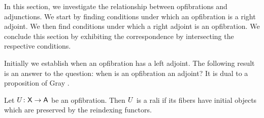 \documentclass{amsart}
\begin{document}
In this section, we investigate the relationship between opfibrations and adjunctions. We start by finding conditions under which an opfibration is a right adjoint.  We then find conditions under which a right adjoint is an opfibration. We conclude this section by exhibiting the correspondence by intersecting the respective conditions.

Initially we establish when an opfibration has a left adjoint. The following result is an answer to the question: when is an opfibration an adjoint? It is dual to a proposition of Gray \cite[Prop. 4.4]{Grayfibredandcofibred}.

\begin{prop} \label{prop:opfibtolari} Let $U \colon \mathsf{X} \to \mathsf{A}$ be an  opfibration. Then $U$ is a rali if its fibers have initial objects which are preserved by the reindexing functors.
\end{prop}
\end{document}
